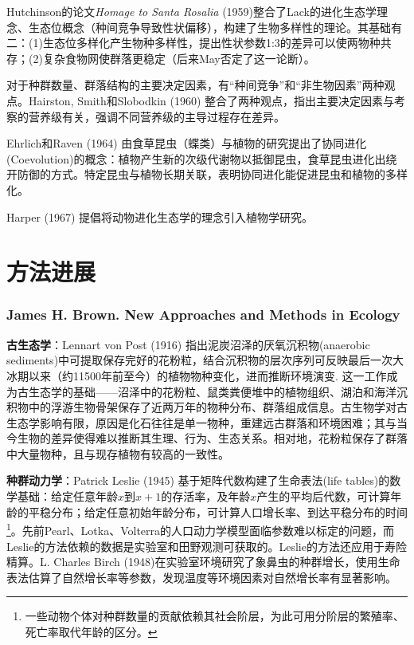 Hutchinson的论文\emph{Homage to Santa Rosalia} (1959)整合了Lack的进化生态学理念、生态位概念（种间竞争导致性状偏移），构建了生物多样性的理论。其基础有二：(1)生态位多样化产生物种多样性，提出性状参数1:3的差异可以使两物种共存；(2)复杂食物网使群落更稳定（后来May否定了这一论断）。

对于种群数量、群落结构的主要决定因素，有“种间竞争”和“非生物因素”两种观点。Hairston, Smith和Slobodkin (1960) 整合了两种观点，指出主要决定因素与考察的营养级有关，强调不同营养级的主导过程存在差异。

Ehrlich和Raven (1964) 由食草昆虫（蝶类）与植物的研究提出了协同进化(Coevolution)的概念：植物产生新的次级代谢物以抵御昆虫，食草昆虫进化出绕开防御的方式。特定昆虫与植物长期关联，表明协同进化能促进昆虫和植物的多样化。

Harper (1967) 提倡将动物进化生态学的理念引入植物学研究。

\section{方法进展}

\subsubsection*{James H. Brown. New Approaches and Methods in Ecology}

\textbf{古生态学}：Lennart von Post (1916) 指出泥炭沼泽的厌氧沉积物(anaerobic sediments)中可提取保存完好的花粉粒，结合沉积物的层次序列可反映最后一次大冰期以来（约11500年前至今）的植物物种变化，进而推断环境演变. 这一工作成为古生态学的基础——沼泽中的花粉粒、鼠类粪便堆中的植物组织、湖泊和海洋沉积物中的浮游生物骨架保存了近两万年的物种分布、群落组成信息。古生物学对古生态学影响有限，原因是化石往往是单一物种，重建远古群落和环境困难；其与当今生物的差异使得难以推断其生理、行为、生态关系。相对地，花粉粒保存了群落中大量物种，且与现存植物有较高的一致性。

\textbf{种群动力学}：Patrick Leslie (1945) 基于矩阵代数构建了生命表法(life tables)的数学基础：给定任意年龄$x$到$x+1$的存活率，及年龄$x$产生的平均后代数，可计算年龄的平稳分布；给定任意初始年龄分布，可计算人口增长率、到达平稳分布的时间\footnote{一些动物个体对种群数量的贡献依赖其社会阶层，为此可用分阶层的繁殖率、死亡率取代年龄的区分。}。先前Pearl、Lotka、Volterra的人口动力学模型面临参数难以标定的问题，而Leslie的方法依赖的数据是实验室和田野观测可获取的。Leslie的方法还应用于寿险精算。L. Charles Birch (1948)在实验室环境研究了象鼻虫的种群增长，使用生命表法估算了自然增长率等参数，发现温度等环境因素对自然增长率有显著影响。

